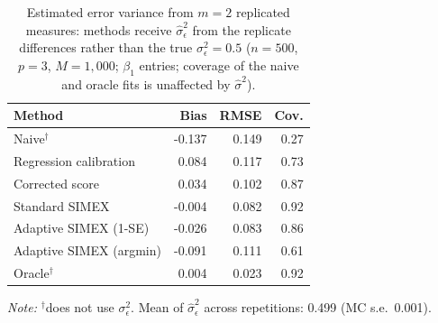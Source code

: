 \begin{table}[t]
\centering
\footnotesize
\caption{Estimated error variance from $m=2$ replicated measures:
methods receive $\hat\sigma^2_\epsilon$ from the replicate
differences rather than the true $\sigma^2_\epsilon=0.5$
($n=500$, $p=3$, $M=1{,}000$; $\beta_1$ entries; coverage of the
naive and oracle fits is unaffected by $\hat\sigma^2$).}
\label{tab:sigma2-est}
\begin{tabular}{l rrr}
\toprule
Method & Bias & RMSE & Cov. \\
\midrule
Naive$^{\dagger}$ & -0.137 & 0.149 & 0.27 \\
Regression calibration & 0.084 & 0.117 & 0.73 \\
Corrected score & 0.034 & 0.102 & 0.87 \\
Standard SIMEX & -0.004 & 0.082 & 0.92 \\
Adaptive SIMEX (1-SE) & -0.026 & 0.083 & 0.86 \\
Adaptive SIMEX (argmin) & -0.091 & 0.111 & 0.61 \\
Oracle$^{\dagger}$ & 0.004 & 0.023 & 0.92 \\
\bottomrule
\end{tabular}
\par\footnotesize \emph{Note:} $^{\dagger}$does not use
$\sigma^2_\epsilon$. Mean of $\hat\sigma^2_\epsilon$
across repetitions: 0.499 (MC s.e.\ 0.001).
\end{table}